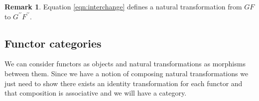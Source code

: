 \documentclass[11pt,a4paper]{article}
\theoremstyle{definition}
\newtheorem{remark}[thm]{Remark}
\numberwithin{equation}{section}
\begin{document}
\begin{remark}
    Equation \eqref{eqn:interchange} defines a natural transformation from $GF$ to $G^{\prime\prime}F^{\prime\prime}$.
\end{remark}
\subsection{Functor categories}
\label{ss:functorcat} 
We can consider functors as objects and natural transformations as morphisms between them. Since we have a notion of composing natural transformations we just need to show there exists an identity transformation for each functor and that composition is associative and we will have a category.
\end{document}
